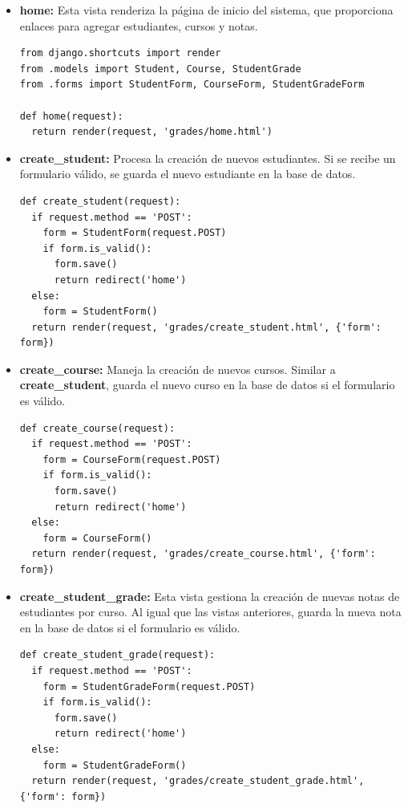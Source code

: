\documentclass[10pt, a4paper]{article}
\begin{document}
\begin{itemize}
  \item \textbf{home:} Esta vista renderiza la página de inicio del sistema, que proporciona enlaces para agregar estudiantes, cursos y notas.

\begin{verbatim}
from django.shortcuts import render
from .models import Student, Course, StudentGrade
from .forms import StudentForm, CourseForm, StudentGradeForm

def home(request):
  return render(request, 'grades/home.html')
\end{verbatim}

  \item \textbf{create\_student:} Procesa la creación de nuevos estudiantes. Si se recibe un formulario válido, se guarda el nuevo estudiante en la base de datos.

\begin{verbatim}
def create_student(request):
  if request.method == 'POST':
    form = StudentForm(request.POST)
    if form.is_valid():
      form.save()
      return redirect('home')
  else:
    form = StudentForm()
  return render(request, 'grades/create_student.html', {'form': form})
\end{verbatim}


  \item \textbf{create\_course:} Maneja la creación de nuevos cursos. Similar a \textbf{create\_student}, guarda el nuevo curso en la base de datos si el formulario es válido.

\begin{verbatim}
def create_course(request):
  if request.method == 'POST':
    form = CourseForm(request.POST)
    if form.is_valid():
      form.save()
      return redirect('home')
  else:
    form = CourseForm()
  return render(request, 'grades/create_course.html', {'form': form})
\end{verbatim}
  
  \item \textbf{create\_student\_grade:} Esta vista gestiona la creación de nuevas notas de estudiantes por curso. Al igual que las vistas anteriores, guarda la nueva nota en la base de datos si el formulario es válido.

\begin{verbatim}
def create_student_grade(request):
  if request.method == 'POST':
    form = StudentGradeForm(request.POST)
    if form.is_valid():
      form.save()
      return redirect('home')
  else:
    form = StudentGradeForm()
  return render(request, 'grades/create_student_grade.html', {'form': form})
\end{verbatim}

\end{itemize}
\end{document}
